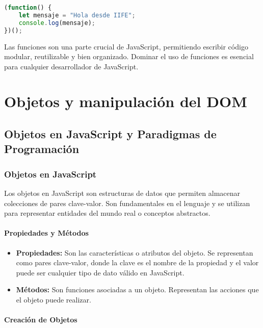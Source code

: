 \documentclass{book}
\begin{document}
\begin{lstlisting}[language=JavaScript]
(function() {
    let mensaje = "Hola desde IIFE";
    console.log(mensaje);
})();
\end{lstlisting}

Las funciones son una parte crucial de JavaScript, permitiendo escribir código modular, reutilizable y bien organizado. Dominar el uso de funciones es esencial para cualquier desarrollador de JavaScript.

\chapter{Objetos y manipulación del DOM}

\section{Objetos en JavaScript y Paradigmas de Programación}

\subsection{Objetos en JavaScript}

Los objetos en JavaScript son estructuras de datos que permiten almacenar colecciones de pares clave-valor. Son fundamentales en el lenguaje y se utilizan para representar entidades del mundo real o conceptos abstractos.

\subsubsection{Propiedades y Métodos}

\begin{itemize}
    \item \textbf{Propiedades:} Son las características o atributos del objeto. Se representan como pares clave-valor, donde la clave es el nombre de la propiedad y el valor puede ser cualquier tipo de dato válido en JavaScript.
    
    \item \textbf{Métodos:} Son funciones asociadas a un objeto. Representan las acciones que el objeto puede realizar.
\end{itemize}

\subsubsection{Creación de Objetos}
\end{document}
